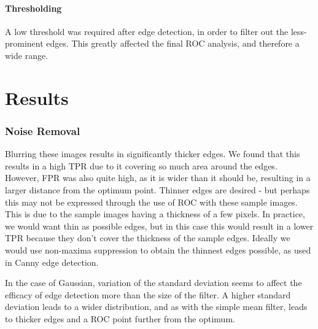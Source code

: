 \documentclass[10pt,a4paper]{article}
\begin{document}
\paragraph{Thresholding}
A low threshold was required after edge detection, in order to filter out the less-prominent edges. This greatly affected the final ROC analysis, and therefore a wide range.


\section*{Results}
\subsubsection*{Noise Removal}
Blurring these images results in significantly thicker edges. We found that this results in a high TPR due to it covering so much area around the edges. However, FPR was also quite high, as it is wider than it should be, resulting in a larger distance from the optimum point. Thinner edges are desired - but perhaps this may not be expressed through the use of ROC with these sample images. This is due to the sample images having a thickness of a few pixels. In practice, we would want thin as possible edges, but in this case this would result in a lower TPR because they don’t cover the thickness of the sample edges. Ideally we would use non-maxima suppression to obtain the thinnest edges possible, as used in Canny edge detection.

In the case of Gaussian, variation of the standard deviation seems to affect the efficacy of edge detection more than the size of the filter. A higher standard deviation leads to a wider distribution, and as with the simple mean filter, leads to thicker edges and a ROC point further from the optimum. 
\end{document}

